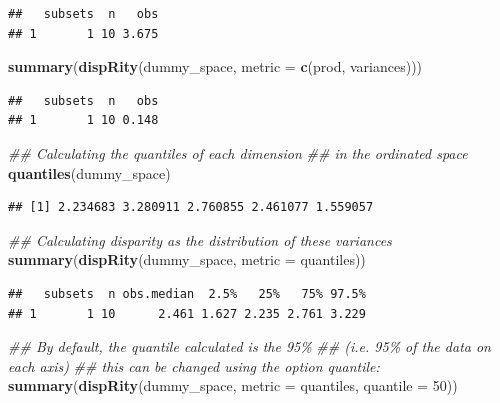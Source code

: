 \documentclass[
]{book}
\newenvironment{Shaded}{\begin{snugshade}}{\end{snugshade}}
\newcommand{\CommentTok}[1]{\textcolor[rgb]{0.56,0.35,0.01}{\textit{#1}}}
\newcommand{\DataTypeTok}[1]{\textcolor[rgb]{0.13,0.29,0.53}{#1}}
\newcommand{\DecValTok}[1]{\textcolor[rgb]{0.00,0.00,0.81}{#1}}
\newcommand{\KeywordTok}[1]{\textcolor[rgb]{0.13,0.29,0.53}{\textbf{#1}}}
\newcommand{\NormalTok}[1]{#1}
\begin{document}
\begin{verbatim}
##   subsets  n   obs
## 1       1 10 3.675
\end{verbatim}

\begin{Shaded}
\begin{Highlighting}[]
\KeywordTok{summary}\NormalTok{(}\KeywordTok{dispRity}\NormalTok{(dummy\_space, }\DataTypeTok{metric =} \KeywordTok{c}\NormalTok{(prod, variances)))}
\end{Highlighting}
\end{Shaded}

\begin{verbatim}
##   subsets  n   obs
## 1       1 10 0.148
\end{verbatim}

\begin{Shaded}
\begin{Highlighting}[]
\CommentTok{\#\# Calculating the quantiles of each dimension}
\CommentTok{\#\# in the ordinated space}
\KeywordTok{quantiles}\NormalTok{(dummy\_space)}
\end{Highlighting}
\end{Shaded}

\begin{verbatim}
## [1] 2.234683 3.280911 2.760855 2.461077 1.559057
\end{verbatim}

\begin{Shaded}
\begin{Highlighting}[]
\CommentTok{\#\# Calculating disparity as the distribution of these variances}
\KeywordTok{summary}\NormalTok{(}\KeywordTok{dispRity}\NormalTok{(dummy\_space, }\DataTypeTok{metric =}\NormalTok{ quantiles))}
\end{Highlighting}
\end{Shaded}

\begin{verbatim}
##   subsets  n obs.median  2.5%   25%   75% 97.5%
## 1       1 10      2.461 1.627 2.235 2.761 3.229
\end{verbatim}

\begin{Shaded}
\begin{Highlighting}[]
\CommentTok{\#\# By default, the quantile calculated is the 95\%}
\CommentTok{\#\# (i.e. 95\% of the data on each axis)}
\CommentTok{\#\# this can be changed using the option quantile:}
\KeywordTok{summary}\NormalTok{(}\KeywordTok{dispRity}\NormalTok{(dummy\_space, }\DataTypeTok{metric =}\NormalTok{ quantiles, }\DataTypeTok{quantile =} \DecValTok{50}\NormalTok{))}
\end{Highlighting}
\end{Shaded}
\end{document}
